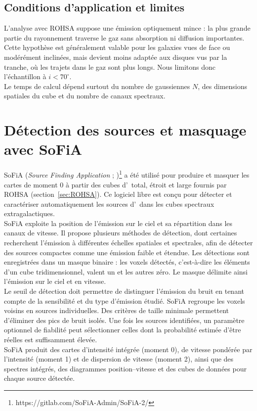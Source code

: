 \subsection{Conditions d'application et limites}

L'analyse avec ROHSA suppose une émission optiquement mince : la plus grande partie du rayonnement traverse le gaz sans absorption ni diffusion importantes. Cette hypothèse est généralement valable pour les galaxies vues de face ou modérément inclinées, mais devient moins adaptée aux disques vus par la tranche, où les trajets dans le gaz sont plus longs. Nous limitons donc l'échantillon à $i < 70^\circ$.\\\indent
Le temps de calcul dépend surtout du nombre de gaussiennes $N$, des dimensions spatiales du cube et du nombre de canaux spectraux.

\section{Détection des sources et masquage avec SoFiA}
\label{sec:sofia}

SoFiA (\textit{Source Finding Application} ; \citealt{serra2015})\footnote{https://gitlab.com/SoFiA-Admin/SoFiA-2/} a été utilisé pour produire et masquer les cartes de moment 0 à partir des cubes d'\HI\ total, étroit et large fournis par ROHSA (section~\ref{sec:ROHSA}). Ce logiciel libre est conçu pour détecter et caractériser automatiquement les sources d'\HI\ dans les cubes spectraux extragalactiques.\\\indent
SoFiA exploite la position de l'émission sur le ciel et sa répartition dans les canaux de vitesse. Il propose plusieurs méthodes de détection, dont certaines recherchent l'émission à différentes échelles spatiales et spectrales, afin de détecter des sources compactes comme une émission faible et étendue. Les détections sont enregistrées dans un masque binaire : les voxels détectés, c'est-à-dire les éléments d'un cube tridimensionnel, valent un et les autres zéro. Le masque délimite ainsi l'émission sur le ciel et en vitesse.\\\indent
Le seuil de détection doit permettre de distinguer l'émission du bruit en tenant compte de la sensibilité et du type d'émission étudié. SoFiA regroupe les voxels voisins en sources individuelles. Des critères de taille minimale permettent d'éliminer des pics de bruit isolés. Une fois les sources identifiées, un paramètre optionnel de fiabilité peut sélectionner celles dont la probabilité estimée d'être réelles est suffisamment élevée.\\\indent
SoFiA produit des cartes d'intensité intégrée (moment 0), de vitesse pondérée par l'intensité (moment 1) et de dispersion de vitesse (moment 2), ainsi que des spectres intégrés, des diagrammes position--vitesse et des cubes de données pour chaque source détectée.

